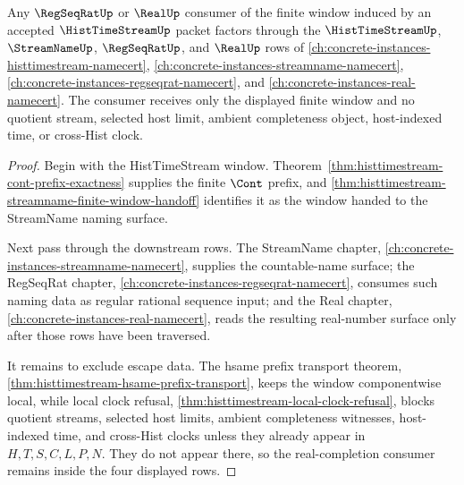 \begin{theorem}
\label{thm:histtimestream-real-completion-window-nonescape}
Any $\RegSeqRatUp$ or $\RealUp$ consumer of the finite window induced by an accepted $\HistTimeStreamUp$ packet factors through the $\HistTimeStreamUp$, $\StreamNameUp$, $\RegSeqRatUp$, and $\RealUp$ rows of \autoref{ch:concrete-instances-histtimestream-namecert}, \autoref{ch:concrete-instances-streamname-namecert}, \autoref{ch:concrete-instances-regseqrat-namecert}, and \autoref{ch:concrete-instances-real-namecert}. The consumer receives only the displayed finite window and no quotient stream, selected host limit, ambient completeness object, host-indexed time, or cross-Hist clock.
\end{theorem}
\begin{proof}
Begin with the HistTimeStream window. Theorem~\ref{thm:histtimestream-cont-prefix-exactness} supplies the finite $\Cont$ prefix, and \autoref{thm:histtimestream-streamname-finite-window-handoff} identifies it as the window handed to the StreamName naming surface.

Next pass through the downstream rows. The StreamName chapter, \autoref{ch:concrete-instances-streamname-namecert}, supplies the countable-name surface; the RegSeqRat chapter, \autoref{ch:concrete-instances-regseqrat-namecert}, consumes such naming data as regular rational sequence input; and the Real chapter, \autoref{ch:concrete-instances-real-namecert}, reads the resulting real-number surface only after those rows have been traversed.

It remains to exclude escape data. The hsame prefix transport theorem, \autoref{thm:histtimestream-hsame-prefix-transport}, keeps the window componentwise local, while local clock refusal, \autoref{thm:histtimestream-local-clock-refusal}, blocks quotient streams, selected host limits, ambient completeness witnesses, host-indexed time, and cross-Hist clocks unless they already appear in $H,T,S,C,L,P,N$. They do not appear there, so the real-completion consumer remains inside the four displayed rows.
\end{proof}

